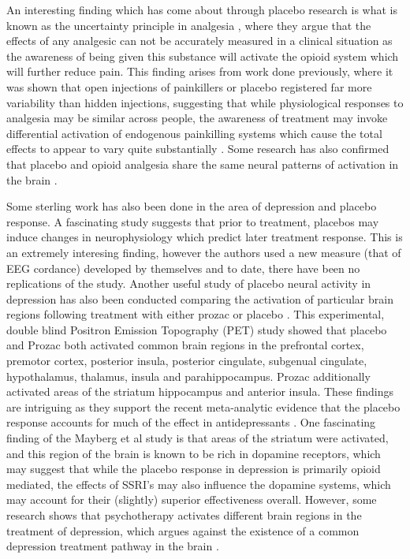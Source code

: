 An interesting finding which has come about through placebo research is what is known as the uncertainty principle in analgesia \cite{Colloca2005} , where they argue that the effects of any analgesic can not be accurately measured in a clinical situation as the awareness of being given this substance will activate the opioid system which will further reduce pain. This finding arises from work done previously, where it was shown that open injections of painkillers or placebo registered far more variability than hidden injections, suggesting that while physiological responses to analgesia may be similar across people, the awareness of treatment may invoke differential activation of endogenous painkilling systems which cause the total effects to appear to vary quite substantially \cite{Amanzio2001} . Some research has also confirmed that placebo and opioid analgesia share the same neural patterns of activation in the brain \cite{Petrovic2005}.

Some sterling work has also been done in the area of depression and placebo response. A fascinating study \cite{Hunter2006}  suggests that prior to treatment, placebos may induce changes in neurophysiology which predict later treatment response. This is an extremely interesing finding, however the authors used a new measure (that of EEG cordance) developed by themselves and to date, there have been no replications of the study. Another useful study of placebo neural activity in depression has also been conducted comparing the activation of particular brain regions following treatment with either prozac or placebo \cite{Mayberg2002}. This experimental, double blind Positron Emission Topography (PET) study showed that placebo and Prozac both activated common brain regions in the prefrontal cortex, premotor cortex, posterior insula, posterior cingulate, subgenual cingulate, hypothalamus, thalamus, insula and parahippocampus. Prozac additionally activated areas of the striatum hippocampus and anterior insula. These findings are intriguing as they support the recent meta-analytic evidence that the placebo response accounts for much of the effect in antidepressants \cite{Kirsch2002a}. One fascinating finding of the Mayberg et al study is that areas of the striatum were activated, and this region of the brain is known to be rich in dopamine receptors, which may suggest that while the placebo response in depression is primarily opioid mediated, the effects of SSRI's may also influence the dopamine systems, which may account for their (slightly) superior effectiveness overall. However, some research shows that psychotherapy activates different brain regions in the treatment of depression, which argues against the existence of a common depression treatment pathway in the brain \cite{Benedetti2008}.


